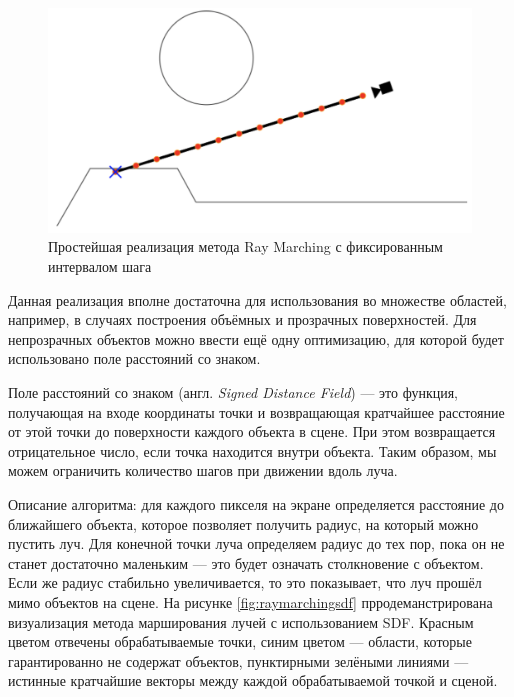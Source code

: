 \begin{figure}[h]
	\centering
	\captionsetup{justification=centering}
	\includegraphics[width=120mm]{img/raymarchingfixed.png}
	\caption{Простейшая реализация метода Ray Marching с фиксированным интервалом шага}
	\label{fig:raymarchingfixed}
\end{figure}

Данная реализация вполне достаточна для использования во множестве 
областей, например, в случаях построения объёмных и прозрачных 
поверхностей.
Для непрозрачных объектов можно ввести ещё одну 
оптимизацию, для которой будет использовано поле расстояний со знаком.

Поле расстояний со знаком (англ. \textit{Signed Distance Field}) — это функция, 
получающая на входе координаты точки и возвращающая кратчайшее 
расстояние от этой точки до поверхности каждого объекта в сцене.
При этом возвращается отрицательное число, если точка находится внутри объекта.
Таким образом, мы можем ограничить количество шагов при движении вдоль 
луча.

Описание алгоритма: для каждого пикселя на экране определяется 
расстояние до ближайшего объекта, которое позволяет получить радиус, на который 
можно пустить луч. 
Для конечной точки луча определяем радиус до тех пор, 
пока он не станет достаточно маленьким --- это будет означать столкновение с 
объектом.
Если же радиус стабильно увеличивается, то это показывает, что луч 
прошёл мимо объектов на сцене.
На рисунке \ref{fig:raymarchingsdf} прродеманстрирована визуализация метода марширования лучей с использованием SDF. Красным цветом отвечены обрабатываемые точки, синим цветом --- области, которые гарантированно не содержат объектов, пунктирными зелёными линиями --- истинные кратчайшие векторы между каждой обрабатываемой точкой и сценой.


